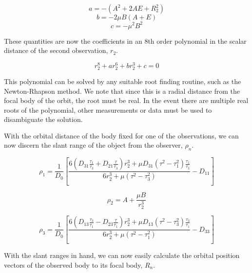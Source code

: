 \documentclass[11pt,twoside,letterpaper]{article}
\begin{document}
  \begin{equation}
    a = -\left(A^2 + 2AE + R_2^2 \right)
  \end{equation}
  \begin{equation}
    b = -2\mu B\left(A+E \right)
  \end{equation}
  \begin{equation}
    c = -{\mu}^2B^2
  \end{equation}

  These quantities are now the coefficients in an 8th order polynomial
  in the scalar distance of the second observation, $r_2$.

  \begin{equation}
    r_2^8 + ar_2^6 + br_2^3 + c = 0
  \end{equation}

  This polynomial can be solved by any suitable root finding routine,
  such as the Newton-Rhapson method. We note that since this is a
  radial distance from the focal body of the orbit, the root must be
  real. In the event there are multiple real roots of the polynomial,
  other measurements or data must be used to disambiguate the solution.

  With the orbital distance of the body fixed for one of the
  observations, we can now discern the slant range of the object from
  the observer, $\rho_n$.

  \begin{equation}
    \rho_1 = \frac{1}{D_0}\left[
      \frac{6\left(D_{31}\frac{\tau_1}{\tau_3} + D_{21}\frac{\tau}{\tau_3}\right)r_2^3
        + \mu D_{31}\left(\tau^2 - \tau_1^2\right)\frac{\tau_1}{\tau_3}}{6r_2^3
        + \mu\left(\tau^2 - \tau_3^2\right)} - D_{11}\right]
  \end{equation}

  \begin{equation}
    \rho_2 = A + \frac{\mu B}{r_2^3}
  \end{equation}

  \begin{equation}
    \rho_3 = \frac{1}{D_0}\left[
      \frac{6\left(D_{13}\frac{\tau_3}{\tau_1} - D_{23}\frac{\tau}{\tau_1}\right)r_2^3
        + \mu D_{13}\left(\tau^2 - \tau_3^2\right)\frac{\tau_3}{\tau_1}}{6r_2^3
        + \mu\left(\tau^2 - \tau_1^2\right)} - D_{33}\right]    
  \end{equation}

  With the slant ranges in hand, we can now easily calculate the
  orbital position vectors of the observed body to its focal body,
  $R_n$.
\end{document}
